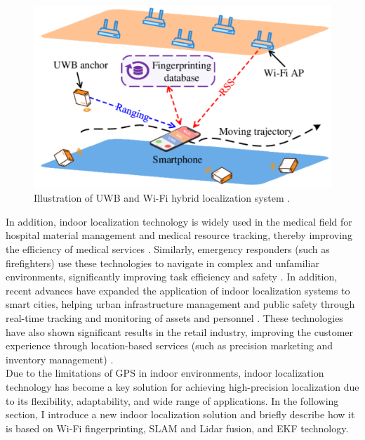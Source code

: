 \documentclass[12pt,a4paper]{article}
\numberwithin{equation}{section}
\begin{document}
\begin{figure}[H]
    \centering
    \includegraphics[width=0.8\linewidth]{images/intro.png}
    \caption{Illustration of UWB and Wi-Fi hybrid localization system \cite{article}.}
    \label{fig:Illustration of UWB and Wi-Fi hybrid localization system}
\end{figure}
\noindent In addition, indoor localization technology is widely used in the medical field for hospital material management and medical resource tracking, thereby improving the efficiency of medical services \cite {HOSSAIN20151}. Similarly, emergency responders (such as firefighters) use these technologies to navigate in complex and unfamiliar environments, significantly improving task efficiency and safety \cite {fischer2010location}. In addition, recent advances have expanded the application of indoor localization systems to smart cities, helping urban infrastructure management and public safety through real-time tracking and monitoring of assets and personnel \cite{zhang2020smartcity}. These technologies have also shown significant results in the retail industry, improving the customer experience through location-based services (such as precision marketing and inventory management) \cite{chen2019indoor}.\\
Due to the limitations of GPS in indoor environments, indoor localization technology has become a key solution for achieving high-precision localization due to its flexibility, adaptability, and wide range of applications. In the following section, I introduce a new indoor localization solution and briefly describe how it is based on Wi-Fi fingerprinting, SLAM and Lidar fusion, and EKF technology.
\end{document}
